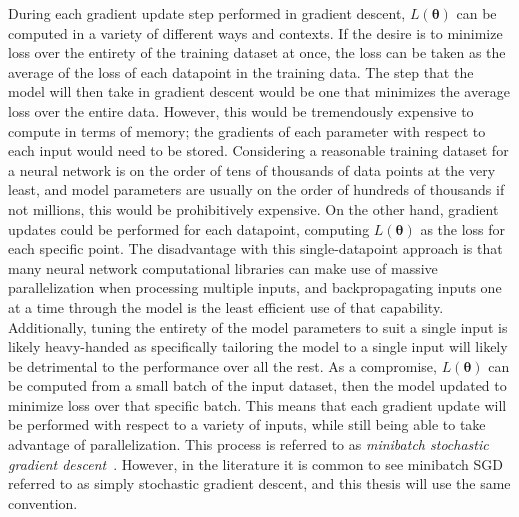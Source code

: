During each gradient update step performed in gradient descent, $\mathit{L}(\mathbf{\theta})$ can be computed
in a variety of different ways and contexts. If the desire is to minimize loss over the entirety of the training dataset at once,
the loss can be taken as the average of the loss
of each datapoint in the training data. The step that the model will then take in gradient descent would be one that
minimizes the average loss over the entire data. However, this would be tremendously expensive to compute in terms
of memory; the gradients of each parameter with respect to each input would need to be stored. Considering a reasonable
training dataset for a neural network is on the order of tens of thousands of data points at the very least, and model parameters
are usually on the order of hundreds of thousands if not millions, this would be prohibitively expensive. On the other
hand, gradient updates could be performed for each datapoint, computing $\mathit{L}(\mathbf{\theta})$ as the loss for
each specific point. The disadvantage with this single-datapoint approach is that many neural network
computational libraries can make use of massive parallelization when processing multiple inputs, and backpropagating
inputs one at a time through the model is the least efficient use
of that capability. Additionally, tuning the entirety of the model parameters to suit a single input is likely heavy-handed as
specifically tailoring the model to a single input will likely be detrimental to the performance over all the rest. As a compromise,
$\mathit{L}(\mathbf{\theta})$ can be computed from a small batch of the input dataset, then the model updated to minimize loss over
that specific batch. This means that each gradient update will be performed with respect to a variety of inputs, while still being
able to take advantage of parallelization. This process is referred to as \textit{minibatch stochastic gradient descent}~\citep{goodfellow2016}.
However, in the literature it is common to see minibatch SGD referred to as simply stochastic gradient descent, and this
thesis will use the same convention.

